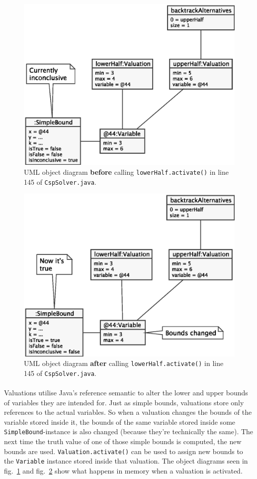 
\begin{multicols}{2}

\begin{figure}[H]
  \includegraphics[width=.5\textwidth]{images/valuation-before}
  \caption{UML object diagram \textbf{before} calling \texttt{lowerHalf.activate()} in line 145 of \texttt{CspSolver.java}.}
  \label{fig:valuation-before}
\end{figure}

\columnbreak    

\begin{figure}[H]
  \includegraphics[width=.5\textwidth]{images/valuation-after}
  \caption{UML object diagram \textbf{after} calling \texttt{lowerHalf.activate()} in line 145 of \texttt{CspSolver.java}.}
  \label{fig:valuation-after}
\end{figure}

\end{multicols}


\paragraph{}
Valuations utilise Java's reference semantic to alter the lower and upper bounds of variables they are intended for.
Just as simple bounds, valuations store only references to the actual variables.
So when a valuation changes the bounds of the variable stored inside it, the bounds of the same variable stored inside some \texttt{SimpleBound}-instance is also changed (because they're technically the same).
The next time the truth value of one of those simple bounds is computed, the new bounds are used.
\texttt{Valuation.activate()} can be used to assign new bounds to the \texttt{Variable} instance stored inside that valuation.
The object diagrams seen in fig.~\ref{fig:valuation-before} and fig.~\ref{fig:valuation-after} show what happens in memory when a valuation is activated.

